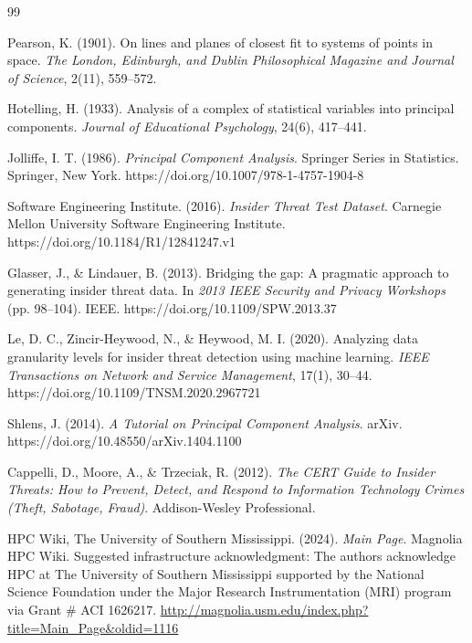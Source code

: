 \documentclass[12pt]{report}
\begin{document}
\begin{thebibliography}{99}

Pearson, K. (1901).
On lines and planes of closest fit to systems of points in space.
\textit{The London, Edinburgh, and Dublin Philosophical Magazine and Journal of Science},
2(11), 559--572.

Hotelling, H. (1933).
Analysis of a complex of statistical variables into principal components.
\textit{Journal of Educational Psychology}, 24(6), 417--441.

Jolliffe, I. T. (1986).
\textit{Principal Component Analysis}.
Springer Series in Statistics.
Springer, New York.
https://doi.org/10.1007/978-1-4757-1904-8

Software Engineering Institute. (2016).
\textit{Insider Threat Test Dataset}.
Carnegie Mellon University Software Engineering Institute.
https://doi.org/10.1184/R1/12841247.v1

Glasser, J., \& Lindauer, B. (2013).
Bridging the gap: A pragmatic approach to generating insider threat data.
In \textit{2013 IEEE Security and Privacy Workshops} (pp. 98--104).
IEEE.
https://doi.org/10.1109/SPW.2013.37

Le, D. C., Zincir-Heywood, N., \& Heywood, M. I. (2020).
Analyzing data granularity levels for insider threat detection using machine learning.
\textit{IEEE Transactions on Network and Service Management}, 17(1), 30--44.
https://doi.org/10.1109/TNSM.2020.2967721

Shlens, J. (2014).
\textit{A Tutorial on Principal Component Analysis}.
arXiv.
https://doi.org/10.48550/arXiv.1404.1100

Cappelli, D., Moore, A., \& Trzeciak, R. (2012).
\textit{The CERT Guide to Insider Threats: How to Prevent, Detect, and Respond to Information Technology Crimes (Theft, Sabotage, Fraud)}.
Addison-Wesley Professional.

HPC Wiki, The University of Southern Mississippi. (2024).
\textit{Main Page}.
Magnolia HPC Wiki.
Suggested infrastructure acknowledgment: The authors acknowledge HPC at The University of Southern Mississippi supported by the National Science Foundation under the Major Research Instrumentation (MRI) program via Grant \# ACI 1626217.
\url{http://magnolia.usm.edu/index.php?title=Main_Page&oldid=1116}


\end{thebibliography}
\end{document}
